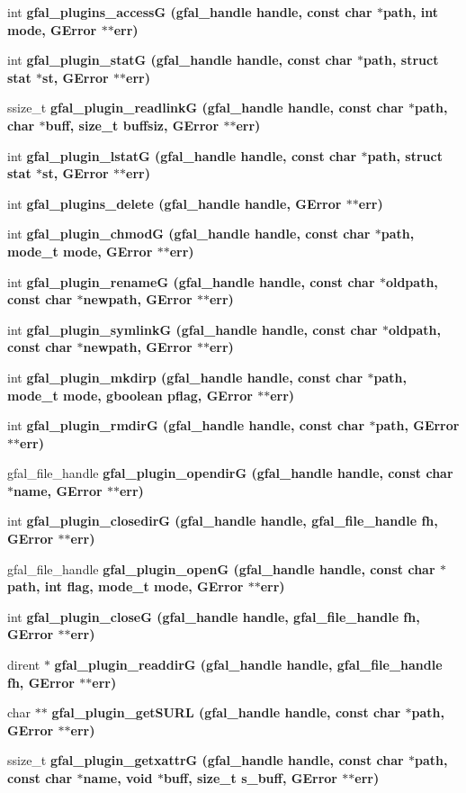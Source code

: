 \begin{CompactItemize}
\item 
int \bf{gfal\_\-plugins\_\-access\-G} (gfal\_\-handle handle, const char $\ast$path, int mode, GError $\ast$$\ast$err)
\item 
int \bf{gfal\_\-plugin\_\-stat\-G} (gfal\_\-handle handle, const char $\ast$path, struct stat $\ast$st, GError $\ast$$\ast$err)
\item 
ssize\_\-t \bf{gfal\_\-plugin\_\-readlink\-G} (gfal\_\-handle handle, const char $\ast$path, char $\ast$buff, size\_\-t buffsiz, GError $\ast$$\ast$err)
\item 
int \bf{gfal\_\-plugin\_\-lstat\-G} (gfal\_\-handle handle, const char $\ast$path, struct stat $\ast$st, GError $\ast$$\ast$err)
\item 
int \bf{gfal\_\-plugins\_\-delete} (gfal\_\-handle handle, GError $\ast$$\ast$err)
\item 
int \bf{gfal\_\-plugin\_\-chmod\-G} (gfal\_\-handle handle, const char $\ast$path, mode\_\-t mode, GError $\ast$$\ast$err)
\item 
int \bf{gfal\_\-plugin\_\-rename\-G} (gfal\_\-handle handle, const char $\ast$oldpath, const char $\ast$newpath, GError $\ast$$\ast$err)
\item 
int \bf{gfal\_\-plugin\_\-symlink\-G} (gfal\_\-handle handle, const char $\ast$oldpath, const char $\ast$newpath, GError $\ast$$\ast$err)
\item 
int \bf{gfal\_\-plugin\_\-mkdirp} (gfal\_\-handle handle, const char $\ast$path, mode\_\-t mode, gboolean pflag, GError $\ast$$\ast$err)
\item 
int \bf{gfal\_\-plugin\_\-rmdir\-G} (gfal\_\-handle handle, const char $\ast$path, GError $\ast$$\ast$err)
\item 
gfal\_\-file\_\-handle \bf{gfal\_\-plugin\_\-opendir\-G} (gfal\_\-handle handle, const char $\ast$name, GError $\ast$$\ast$err)
\item 
int \bf{gfal\_\-plugin\_\-closedir\-G} (gfal\_\-handle handle, gfal\_\-file\_\-handle fh, GError $\ast$$\ast$err)
\item 
gfal\_\-file\_\-handle \bf{gfal\_\-plugin\_\-open\-G} (gfal\_\-handle handle, const char $\ast$path, int flag, mode\_\-t mode, GError $\ast$$\ast$err)
\item 
int \bf{gfal\_\-plugin\_\-close\-G} (gfal\_\-handle handle, gfal\_\-file\_\-handle fh, GError $\ast$$\ast$err)
\item 
dirent $\ast$ \bf{gfal\_\-plugin\_\-readdir\-G} (gfal\_\-handle handle, gfal\_\-file\_\-handle fh, GError $\ast$$\ast$err)
\item 
char $\ast$$\ast$ \bf{gfal\_\-plugin\_\-get\-SURL} (gfal\_\-handle handle, const char $\ast$path, GError $\ast$$\ast$err)
\item 
ssize\_\-t \bf{gfal\_\-plugin\_\-getxattr\-G} (gfal\_\-handle handle, const char $\ast$path, const char $\ast$name, void $\ast$buff, size\_\-t s\_\-buff, GError $\ast$$\ast$err)\label{gfal__common__plugin_8c_de1aadc6ff10f7fef83cb57a21ef1406}


\end{CompactItemize}
